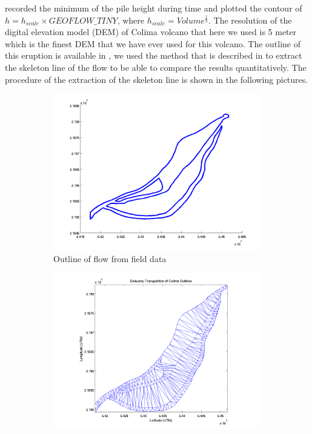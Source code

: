 \documentclass[letterpaper,10pt]{article}
\begin{document}
recorded the minimum of the pile height during time and plotted the contour of $ h = h_{scale} \times GEOFLOW \_ TINY$, where 
$ h_{scale} =Volume^\frac{1}{3} $.
The resolution of the digital elevation model (DEM) of Colima volcano that here we used is 5 meter which is the finest DEM 
that we have ever used for this volcano.
The outline of this eruption is available in \cite{NamikawaPhD}, we used the method that is described in \cite{NamikawaPhD} to 
extract the skeleton line of the flow to be able to compare the results quantitatively. The procedure of the extraction of the 
skeleton line is shown in the following pictures. 
\begin{figure}
        \centering
        \begin{subfigure}[b]{0.45\textwidth}
                \includegraphics[width=\textwidth]{IMAGES/pics/outline.png}
                \caption{Outline of flow from field data}
                \label{fig:Outline}
        \end{subfigure}%
        \begin{subfigure}[b]{0.45\textwidth}
                \includegraphics[width=\textwidth]{IMAGES/pics/Delaunay_Triangulation_of_Colima_clean.png}

\end{subfigure}
\end{figure}
\end{document}
